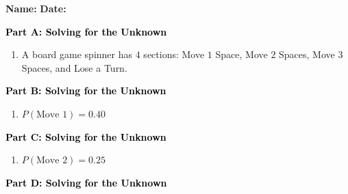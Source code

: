 \documentclass[12pt, letterpaper, fleqn]{article}
\begin{document}
\textbf{Name:} \underline{\hspace{5cm}}
\hfill
\textbf{Date:} \underline{\hspace{3cm}}\\

\begin{tcolorbox}[colback=customteal!20]
\large\textcolor{black}{\textbf{Part A: Solving for the Unknown}}
\end{tcolorbox}

\vspace{3mm}

\begin{enumerate}[itemsep=5.5cm, leftmargin=0.6cm]
\item A board game spinner has $4$ sections: Move $1$ Space, Move $2$ Spaces, Move $3$ Spaces, and Lose a Turn.
\end{enumerate}

\newpage

\begin{tcolorbox}[colback=customteal!20]
\large\textcolor{black}{\textbf{Part B: Solving for the Unknown}}
\end{tcolorbox}

\vspace{3mm}

\begin{enumerate}[itemsep=5.5cm, leftmargin=0.6cm, resume]
\item $P(\text{Move 1}) = 0.40$
\end{enumerate}

\newpage

\begin{tcolorbox}[colback=customteal!20]
\large\textcolor{black}{\textbf{Part C: Solving for the Unknown}}
\end{tcolorbox}

\vspace{3mm}

\begin{enumerate}[itemsep=5.5cm, leftmargin=0.6cm, resume]
\item $P(\text{Move 2}) = 0.25$
\end{enumerate}

\newpage

\begin{tcolorbox}[colback=customteal!20]
\large\textcolor{black}{\textbf{Part D: Solving for the Unknown}}
\end{tcolorbox}
\end{document}
